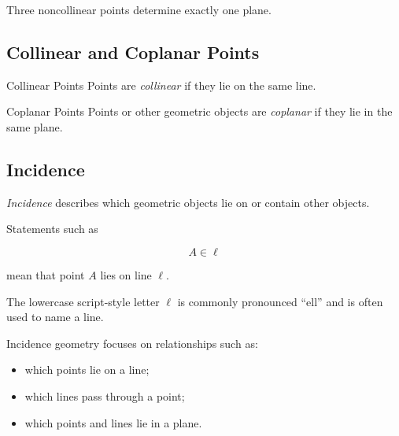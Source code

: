 Three noncollinear points determine exactly one plane.

\begin{centereddiagram}
\end{centereddiagram}

\subsection{Collinear and Coplanar Points}
\label{subsec:collinear-coplanar}

\begin{definitionbox}{Collinear Points}
Points are \emph{collinear} if they lie on the same line.
\end{definitionbox}

\begin{definitionbox}{Coplanar Points}
Points or other geometric objects are \emph{coplanar} if they lie in the
same plane.
\end{definitionbox}

\subsection{Incidence}
\label{subsec:incidence-euclidean}

\emph{Incidence} describes which geometric objects lie on or contain other
objects.

Statements such as

\[
A\in\ell
\]

mean that point \(A\) lies on line \(\ell\).

The lowercase script-style letter \(\ell\) is commonly pronounced ``ell''
and is often used to name a line.

Incidence geometry focuses on relationships such as:

\begin{itemize}
    \item which points lie on a line;
    \item which lines pass through a point;
    \item which points and lines lie in a plane.
\end{itemize}

